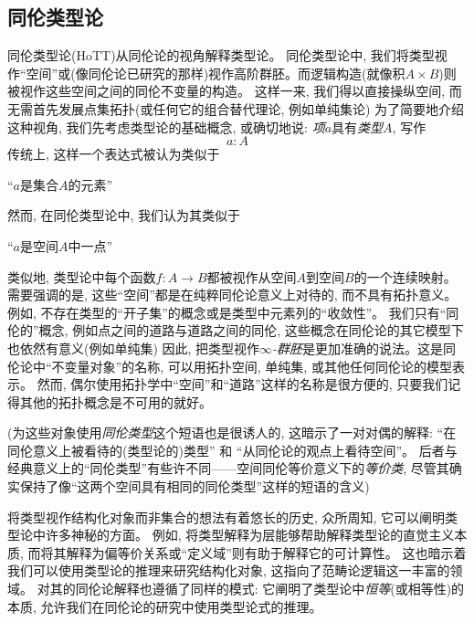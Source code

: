 \subsection*{同伦类型论}

同伦类型论(HoTT)从同伦论的视角解释类型论。
同伦类型论中, 我们将类型视作``空间''或(像同伦论已研究的那样)视作高阶群胚。而逻辑构造(就像积$A \times B$)则被视作这些空间之间的同伦不变量的构造。
这样一来, 我们得以直接操纵空间, 而无需首先发展点集拓扑(或任何它的组合替代理论, 例如单纯集论)
为了简要地介绍这种视角, 我们先考虑类型论的基础概念, 或确切地说:
\emph{项}$a$具有\emph{类型}$A$, 写作
\[
a : A
\]
传统上, 这样一个表达式被认为类似于
\begin{center}
``$a$是集合$A$的元素''
\end{center}
然而, 在同伦类型论中, 我们认为其类似于
\begin{center}
``$a$是空间$A$中一点''
\end{center}

%

类似地, 类型论中每个函数$f: A\to B$都被视作从空间$A$到空间$B$的一个连续映射。
需要强调的是, 这些``空间''都是在纯粹同伦论意义上对待的, 而不具有拓扑意义。
例如, 不存在类型的``开子集''的概念或是类型中元素列的``收敛性''。
我们只有``同伦的''概念, 例如点之间的道路与道路之间的同伦, 这些概念在同伦论的其它模型下也依然有意义(例如单纯集)
因此, 把类型视作\emph{$\infty$-群胚}是更加准确的说法。这是同伦论中``不变量对象''的名称, 可以用拓扑空间, 
%
单纯集, 或其他任何同伦论的模型表示。
然而, 偶尔使用拓扑学中``空间''和``道路''这样的名称是很方便的, 只要我们记得其他的拓扑概念是不可用的就好。

(为这些对象使用\emph{同伦类型}这个短语也是很诱人的, 
%
这暗示了一对对偶的解释: ``在同伦意义上被看待的(类型论的)类型'' 和 ``从同伦论的观点上看待空间''。
后者与经典意义上的``同伦类型''有些许不同——空间同伦等价意义下的\emph{等价类}, 尽管其确实保持了像``这两个空间具有相同的同伦类型''这样的短语的含义)

将类型视作结构化对象而非集合的想法有着悠长的历史, 众所周知, 它可以阐明类型论中许多神秘的方面。
例如, 将类型解释为层能够帮助解释类型论的直觉主义本质, 而将其解释为偏等价关系或``定义域''则有助于解释它的可计算性。
这也暗示着我们可以使用类型论的推理来研究结构化对象, 这指向了范畴论逻辑这一丰富的领域。
对其的同伦论解释也遵循了同样的模式: 它阐明了类型论中\emph{恒等}(或相等性)的本质, 允许我们在同伦论的研究中使用类型论式的推理。

